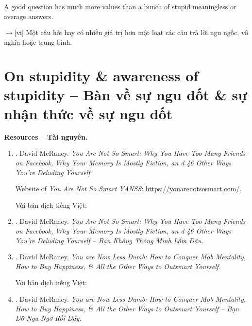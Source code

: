 \documentclass[12pt,twoside]{book}
\begin{document}
A good question has much more values than a bunch of stupid meaningless or average answers.

{\sf[en]$\to$[vi]} Một câu hỏi hay có nhiều giá trị hơn một loạt các câu trả lời ngu ngốc, vô nghĩa hoặc trung bình.

\section{On stupidity \& awareness of stupidity -- Bàn về sự ngu dốt \& sự nhận thức về sự ngu dốt}
{\bf \textsf{Resources -- Tài nguyên.}}
\begin{enumerate}
	\item \cite{McRaney_not_smart}. {\sc David McRaney}. {\it You Are Not So Smart: Why You Have Too Many Friends on Facebook, Why Your Memory Is Mostly Fiction, an d 46 Other Ways You're Deluding Yourself}.
	
	Website of {\it You Are Not So Smart YANSS}: \url{https://youarenotsosmart.com/}.
	
	Với bản dịch tiếng Việt:
	\item \cite{McRaney_not_smart_VN}. {\sc David McRaney}. {\it You Are Not So Smart: Why You Have Too Many Friends on Facebook, Why Your Memory Is Mostly Fiction, an d 46 Other Ways You're Deluding Yourself -- Bạn Không Thông Minh Lắm Đâu}.
	\item \cite{McRaney_less_stupid}. {\sc David McRaney}. {\it You are Now Less Dumb: How to Conquer Mob Mentality, How to Buy Happiness, \& All the Other Ways to Outsmart Yourself}.
	
	Với bản dịch tiếng Việt:
	\item \cite{McRaney_not_smart_VN}. {\sc David McRaney}. {\it You are Now Less Dumb: How to Conquer Mob Mentality, How to Buy Happiness, \& All the Other Ways to Outsmart Yourself -- Bạn Đỡ Ngu Ngơ Rồi Đấy}.
\end{enumerate}
\end{document}

